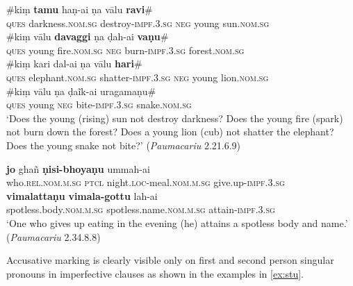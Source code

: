 \documentclass[output=paper,
modfonts
]{LSP/langsci}
\begin{document}
\begin{exe}
\ex\label{ex:mno}\gll \#kiṃ \textbf{tamu} haṇ-ai ṇa vālu \textbf{ravi}\#  \\
\textsc{ques} darkness.\textsc{nom.sg} destroy-\textsc{impf.3.sg} \textsc{neg}  young sun.\textsc{nom.sg} \\

\gll \#kiṃ vālu \textbf{davaggi} ṇa  ḍah-ai \textbf{vaṇu}\# \\
 \textsc{ques }  young fire.\textsc{nom.sg} \textsc{neg} burn-\textsc{impf.3.sg} forest.\textsc{nom.sg} \\

\gll \#kiṃ kari dal-ai ṇa vālu \textbf{hari}\# \\
\textsc{ques} elephant.\textsc{nom.sg}  shatter-\textsc{impf.3.sg} \textsc{neg} young lion.\textsc{nom.sg} \\

\gll  \#kiṃ vālu ṇa ḍaĩk-ai uragamaṇu\#   \\
\textsc{ques} young \textsc{neg} bite-\textsc{impf.3.sg} snake.\textsc{nom.sg} \\
\glt `Does the young (rising) sun not destroy darkness? Does the young fire (spark) not burn down the forest? Does a young lion (cub) not shatter the elephant? Does the young snake not bite?' (\textit{Paumacariu}  2.21.6.9)

\ex\label{ex:pqr}\gll \textbf{jo} ghañ \textbf{ṇisi-bhoyaṇu} ummah-ai\\
who.\textsc{rel.nom.m.sg} \textsc{ptcl} night.\textsc{loc}-meal.\textsc{nom.m.sg} give.up-\textsc{impf.3.sg}\\

\gll \textbf{vimalattaṇu} \textbf{vimala-gottu} lah-ai \\
spotless.body.\textsc{nom.m.sg} spotless.name.\textsc{nom.m.sg} attain-\textsc{impf.3.sg} \\
\glt `One who gives up eating in the evening (he) attains a spotless body and name.'  (\textit{Paumacariu} 2.34.8.8)
\end{exe}



Accusative marking is clearly visible only on first and second person singular pronouns in imperfective clauses as shown in the examples in \cref{ex:stu}. 
\end{document}

